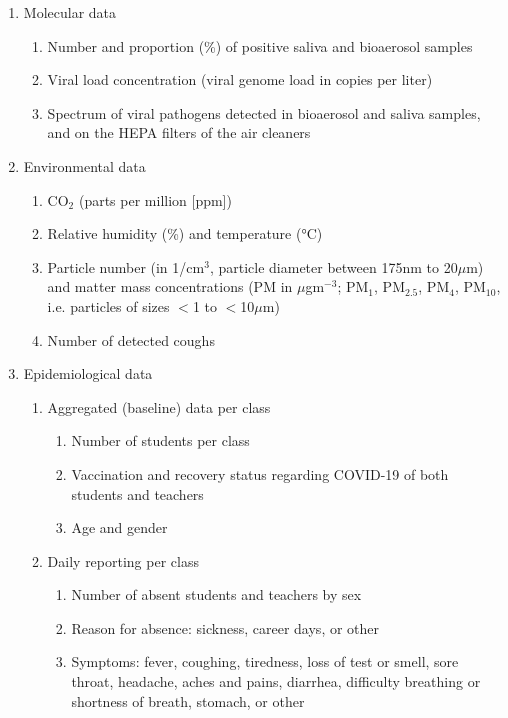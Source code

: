 \documentclass{article}
\begin{document}
\begin{enumerate}
    \item Molecular data
    \begin{enumerate}
        \item Number and proportion (\%) of positive saliva and bioaerosol samples
        \item Viral load concentration (viral genome load in copies per liter)
        \item Spectrum of viral pathogens detected in bioaerosol and saliva samples, and on the HEPA filters of the air cleaners
    \end{enumerate}
    \item Environmental data 
    \begin{enumerate}
        \item CO$_2$ (parts per million [ppm])
        \item Relative humidity (\%) and temperature (°C)
        \item Particle number (in 1/cm$^3$, particle diameter between 175nm to 20$\mu$m) and matter mass concentrations (PM in $\mu$gm$^{-3}$; PM$_1$, PM$_{2.5}$, PM$_4$, PM$_{10}$, i.e. particles of sizes $<$1 to $<$10$\mu$m)
        \item Number of detected coughs
    \end{enumerate}
    \item Epidemiological data
    \begin{enumerate}
        \item Aggregated (baseline) data per class
        \begin{enumerate}
            \item Number of students per class
            \item Vaccination and recovery status regarding COVID-19 of both students and teachers
            \item Age and gender
        \end{enumerate}
        \item Daily reporting per class
        \begin{enumerate}
            \item Number of absent students and teachers by sex
            \item Reason for absence: sickness, career days, or other
            \item Symptoms: fever, coughing, tiredness, loss of test or smell, sore throat, headache, aches and pains, diarrhea, difficulty breathing or shortness of breath, stomach, or other

\end{enumerate}
\end{enumerate}
\end{enumerate}
\end{document}
